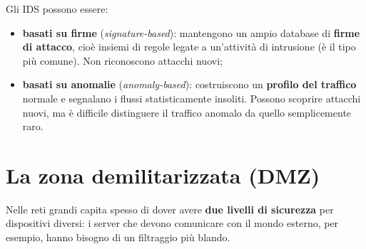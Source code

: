Gli IDS possono essere:

\begin{itemize}
    \item \textbf{basati su firme} (\emph{signature-based}): mantengono un ampio database di \textbf{firme di attacco}, cioè insiemi di regole legate a
          un'attività di intrusione (è il tipo più comune). Non riconoscono attacchi nuovi;
    \item \textbf{basati su anomalie} (\emph{anomaly-based}): costruiscono un \textbf{profilo del traffico} normale e segnalano i flussi statisticamente
          insoliti. Possono scoprire attacchi nuovi, ma è difficile distinguere il traffico anomalo da quello semplicemente raro.
\end{itemize}

\section{La zona demilitarizzata (DMZ)}

Nelle reti grandi capita spesso di dover avere \textbf{due livelli di sicurezza} per dispositivi diversi: i server che devono comunicare con il mondo
esterno, per esempio, hanno bisogno di un filtraggio più blando.


